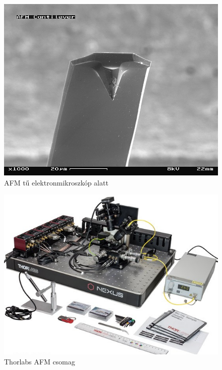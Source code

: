 \documentclass[aspectratio=169]{beamer}
\begin{document}
\begin{frame}
\begin{minipage}[m]{.49\linewidth}
\begin{figure}
\includegraphics[width=\textwidth]{laprugo.jpg}
\caption{AFM tű elektronmikroszkóp alatt}
\end{figure}
\end{minipage}
\begin{minipage}[m]{.49\linewidth}
\begin{figure}
\includegraphics[width=\textwidth]{afm_thor.jpg}
\caption{Thorlabs AFM csomag}
\end{figure}
\end{minipage}
\end{frame}
\end{document}
